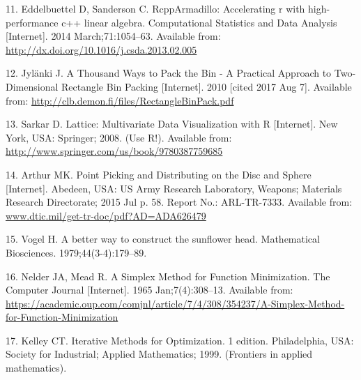 \documentclass[
  headsepline=true,headings=standardclasses%
]{scrartcl}
\theoremstyle{definition}
\theoremstyle{definition}
\theoremstyle{remark}
\begin{document}
\hypertarget{ref-eddelbuettel_2014}{}
11. Eddelbuettel D, Sanderson C. RcppArmadillo: Accelerating r with
high-performance c++ linear algebra. Computational Statistics and Data
Analysis {[}Internet{]}. 2014 March;71:1054--63. Available from:
\url{http://dx.doi.org/10.1016/j.csda.2013.02.005}

\hypertarget{ref-jylanki_2010}{}
12. Jylänki J. A Thousand Ways to Pack the Bin - A Practical Approach to
Two-Dimensional Rectangle Bin Packing {[}Internet{]}. 2010 {[}cited 2017
Aug 7{]}. Available from:
\url{http://clb.demon.fi/files/RectangleBinPack.pdf}

\hypertarget{ref-sarkar_2008}{}
13. Sarkar D. Lattice: Multivariate Data Visualization with R
{[}Internet{]}. New York, USA: Springer; 2008. (Use R!). Available from:
\url{http://www.springer.com/us/book/9780387759685}

\hypertarget{ref-arthur_2015}{}
14. Arthur MK. Point Picking and Distributing on the Disc and Sphere
{[}Internet{]}. Abedeen, USA: US Army Research Laboratory, Weapons;
Materials Research Directorate; 2015 Jul p. 58. Report No.: ARL-TR-7333.
Available from: \url{www.dtic.mil/get-tr-doc/pdf?AD=ADA626479}

\hypertarget{ref-vogel_1979}{}
15. Vogel H. A better way to construct the sunflower head. Mathematical
Biosciences. 1979;44(3-4):179--89.

\hypertarget{ref-nelder_1965}{}
16. Nelder JA, Mead R. A Simplex Method for Function Minimization. The
Computer Journal {[}Internet{]}. 1965 Jan;7(4):308--13. Available from:
\url{https://academic.oup.com/comjnl/article/7/4/308/354237/A-Simplex-Method-for-Function-Minimization}

\hypertarget{ref-kelley_1999}{}
17. Kelley CT. Iterative Methods for Optimization. 1 edition.
Philadelphia, USA: Society for Industrial; Applied Mathematics; 1999.
(Frontiers in applied mathematics).
\end{document}
